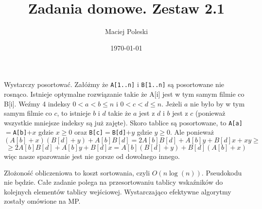 \documentclass[a4paper,12pt]{article}
\title{Zadania domowe. Zestaw 2.1}
\author{Maciej Poleski}
\date{\today}
\begin{document}
\maketitle

\newpage

\section{}
Wystarczy posortować. Załóżmy że \verb|A[1..n]| i \verb|B[1..n]| są posortowane nie rosnąco. Istnieje optymalne rozwiązanie takie że A[i] jest w tym samym filmie co B[i]. Weźmy 4 indeksy $0<a<b\leq{n}$ i $0<c<d\leq{n}$. Jeżeli $a$ nie było by w tym samym filmie co $c$, to istnieje $b$ i $d$ takie że $a$ jest z $d$ i $b$ jest z $c$ (ponieważ wszystkie mniejsze indeksy są już zajęte). Skoro tablice są posortowane, to \verb|A[a]|$=$\verb|A[b]|$+x$ gdzie $x\geq{0}$ oraz \verb|B[c]|$=$\verb|B[d]|$+y$ gdzie $y\geq{0}$. Ale ponieważ $$(A[b]+x)(B[d]+y)+ A[b]B[d] = 2A[b]B[d]+A[b]y+B[d]x+xy\geq$$
$$\geq 2A[b]B[d]+A[b]y+B[d]x = A[b](B[d]+y)+B[d](A[b]+x)$$
więc nasze sparowanie jest nie gorsze od dowolnego innego.

Złożoność obliczeniowa to koszt sortowania, czyli $O(n\log(n))$.
Pseudokodu nie będzie. Całe zadanie polega na przesortowaniu tablicy wskaźników do kolejnych elementów tablicy wejściowej. Wystarczająco efektywne algorytmy zostały omówione na MP.
\end{document}
